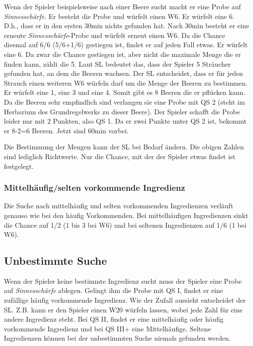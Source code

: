 Wenn der Spieler beispielsweise nach einer Beere sucht macht er eine Probe auf \textit{Sinnesschärfe}. Er besteht die Probe und würfelt einen W6. Er würfelt eine 6. D.h., dass er in den ersten 30min nichts gefunden hat. Nach 30min besteht er eine erneute \textit{Sinnesschärfe}-Probe und würfelt erneut einen W6. Da die Chance diesmal auf 6/6 (5/6+1/6) gestiegen ist, findet er auf jeden Fall etwas. Er würfelt eine 6. Da zwar die Chance gestiegen ist, aber nicht die maximale Menge die er finden kann, zählt die 5. Laut SL bedeutet das, dass der Spieler 5 Sträucher gefunden hat, an dem die Beeren wachsen. Der SL entscheidet, dass er für jeden Strauch einen weiteren W6 würfeln darf um die Menge der Beeren zu bestimmen. Er würfelt eine 1, eine 3 und eine 4. Somit gibt es 8 Beeren die er pflücken kann. Da die Beeren sehr empfindlich sind verlangen sie eine Probe mit QS 2 (steht im Herbarium des Grundregelwerks zu dieser Beere). Der Spieler schafft die Probe leider nur mit 2 Punkten, also QS 1. Da er zwei Punkte unter QS 2 ist, bekommt er 8-2=6 Beeren. Jetzt sind 60min vorbei.

Die Bestimmung der Mengen kann der SL bei Bedarf ändern. Die obigen Zahlen sind lediglich Richtwerte. Nur die Chance, mit der der Spieler etwas findet ist festgelegt.

\subsubsection{Mittelhäufig/selten vorkommende Ingredienz}
Die Suche nach mittelhäufig und selten vorkommenden Ingredienzen verläuft genauso wie bei den häufig Vorkommenden. Bei mittelhäufigen Ingredienzen sinkt die Chance auf 1/2 (1 bis 3 bei W6) und bei seltenen Ingredienzen auf 1/6 (1 bei W6).

\subsection{Unbestimmte Suche}
Wenn der Spieler keine bestimmte Ingredienz sucht muss der Spieler eine Probe auf \textit{Sinnesschärfe} ablegen. Gelingt ihm die Probe mit QS I, findet er eine zufällige häufig vorkommende Ingredienz. Wie der Zufall aussieht entscheidet der SL. Z.B. kann er den Spieler einen W20 würfeln lassen, wobei jede Zahl für eine andere Ingredienz steht. Bei QS II, findet er eine mittelhäufig oder häufig vorkommende Ingredienz und bei QS III+ eine Mittelhäufige. Seltene Ingredienzen können bei der unbestimmten Suche niemals gefunden werden.

